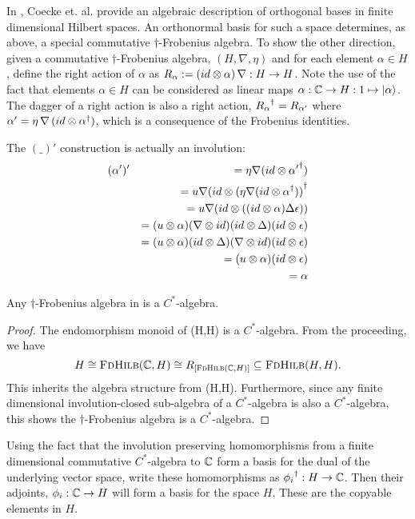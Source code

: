 In \cite{coeckeetal08:ortho}, Coecke et. al. provide an algebraic description of orthogonal bases in
finite dimensional Hilbert spaces. An orthonormal basis for such a space determines, as above,
a special commutative $\dagger$-Frobenius algebra. To show the other direction, given a commutative
$\dagger$-Frobenius algebra, $(H,\nabla,\eta)$ and for each element $\alpha\in H$, define the right
action of $\alpha$ as $R_{\alpha}:=(id\otimes\alpha)\, \nabla:H\to H$. Note the use of the fact that
elements $\alpha\in H$ can be considered as linear maps $\alpha:\mathbb{C} \to H:1\mapsto \left\vert{\alpha}\right\rangle$.
The dagger of a right action is also a right action, ${R_{\alpha}}^{\dagger} = R_{\alpha'}$ where
$\alpha'= \eta\, \nabla\, (id\otimes {\alpha}^{\dagger})$, which is a consequence of the Frobenius identities.

The $(\_)'$ construction is actually an involution:
\begin{eqnarray*}
  &(\alpha')' &= \eta \nabla (id \otimes {\alpha'}^{\dagger}) \\
  && = u \nabla (id \otimes {(\eta \nabla (id \otimes \ensuremath{{\alpha}^{\dagger}}))}^{\dagger}\\
  && = u \nabla (id \otimes ( (id \otimes \alpha) \Delta \epsilon))\\
  && = (u \otimes \alpha) (\nabla \otimes id) (id \otimes \Delta) (id \otimes  \epsilon)\\
  && = (u \otimes \alpha) (id \otimes \Delta) (\nabla \otimes id) (id \otimes  \epsilon)\\
  && = (u \otimes \alpha)  (id \otimes  \epsilon)\\
  && = \alpha
\end{eqnarray*}

\begin{lemma}\label{lemma:cstaralgebra}
  Any $\dagger$-Frobenius algebra in \fdh is a $C^{*}$-algebra.
\end{lemma}
\begin{proof}
  The endomorphism monoid of \fdh(H,H) is a $C^{*}$-algebra. From the proceeding, we have
  \[
    H \cong \textsc{FdHilb}(\mathbb{C},H) \cong R_{[\textsc{FdHilb}(\mathbb{C},H)]}\subseteq\textsc{FdHilb}(H,H).
  \]
  This inherits the algebra structure from \fdh(H,H). Furthermore, since any finite dimensional
  involution-closed sub-algebra of a $C^{*}$-algebra is also a $C^{*}$-algebra, this shows the
  $\dagger$-Frobenius algebra is a $C^{*}$-algebra.
\end{proof}

Using the fact that the involution preserving homomorphisms from a finite dimensional commutative
$C^{*}$-algebra to $\mathbb{C}$ form a basis for the dual of the underlying vector space, write these
homomorphisms as ${\phi_{i}}^{\dagger}:H \to \mathbb{C}$. Then their adjoints, $\phi_{i}:\mathbb{C}\to H$ will form a
basis for the space $H$. These are the copyable elements in $H$.

